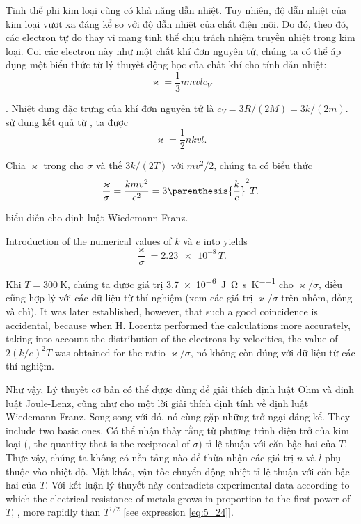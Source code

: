 Tinh thể phi kim loại cũng có khả năng dẫn nhiệt.
Tuy nhiên, độ dẫn nhiệt của kim loại vượt xa đáng kể so với độ dẫn nhiệt của chất điện môi.
Do đó, theo đó, các electron tự do thay vì mạng tinh thể chịu trách nhiệm truyền nhiệt trong kim loại.
Coi các electron này như một chất khí đơn nguyên tử, chúng ta có thể áp dụng một biểu thức từ lý thuyết động học của chất khí cho tính dẫn nhiệt:
\begin{equation}\label{eq:11_11}
    \varkappa = \frac{1}{3} n m v l c_V
\end{equation}

.
Nhiệt dung đặc trưng của khí đơn nguyên tử là  $c_V = 3R/(2M) = 3k/(2m)$.
sử dụng kết quả từ , ta được
\begin{equation*}
    \varkappa = \frac{1}{2} n k v l.
\end{equation*}

Chia $\varkappa$ trong  cho $\sigma$ và thế $3k/(2T)$ với $mv^2/2$, chúng ta có biểu thức
\begin{equation}\label{eq:11_12}
    \frac{\varkappa}{\sigma} = \frac{k m v^2}{e^2} = 3 \parenthesis{\frac{k}{e}}^2 T.
\end{equation}

\noindent
biểu diễn cho định luật Wiedemann-Franz.

Introduction of the numerical values of $k$ và $e$ into  yields
\begin{equation*}
    \frac{\varkappa}{\sigma} = \num{2.23e-8}\, T.
\end{equation*}

\noindent
Khi $T = \SI{300}{\kelvin}$, chúng ta được giá trị \SI{3.7e-6}{\joule\ohm\per\second\per\kelvin} cho $\varkappa/\sigma$, điều cũng hợp lý với các dữ liệu từ thí nghiệm (xem các giá trị $\varkappa/\sigma$ trên nhôm, đồng và chì).
It was later established, however, that such a good coincidence is accidental, because when H. Lorentz performed the calculations more accurately, taking
into account the distribution of the electrons by velocities, the value of $2(k/e)^2 T$ was obtained for the ratio $\varkappa/\sigma$, nó không còn đúng với dữ liệu từ các thí nghiệm.

Như vậy, Lý thuyết cơ bản có thể được dùng để giải thích định luật Ohm và định luật Joule-Lenz, cũng như cho một lời giải thích định tính về định luật Wiedemann-Franz.
Song song với đó, nó cùng gặp những trở ngại đáng kể.
They include two basic ones.
Có thể nhận thấy rằng từ phương trình  điện trở của kim loại (\ie, the quantity that is the reciprocal of $\sigma$) tỉ lệ thuận với căn bậc hai của $T$.
Thực vậy, chúng ta không có nền tảng nào để thừa nhận các giá trị  $n$ và $l$ phụ thuộc vào nhiệt độ.
Mặt khác, vận tốc chuyển động nhiệt  tỉ lệ thuận với căn bậc hai của  $T$.
Với kết luận lý thuyết này contradicts experimental data according to which the electrical resistance of metals grows in proportion to the first power of $T$, \ie, more rapidly than $T^{1/2}$ [see expression \eqref{eq:5_24}].

